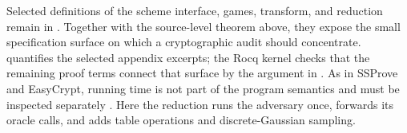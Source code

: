 Selected definitions of the scheme interface, games, transform,
and reduction remain in .  Together with
the source-level theorem above, they expose the small specification surface on
which a cryptographic audit should concentrate.
 quantifies the selected appendix excerpts;
the Rocq kernel checks that the
remaining proof terms connect that surface by the argument in
.  As in SSProve and EasyCrypt, running time is not
part of the program semantics and must be inspected separately
\cite{easycrypt,ssprove}.  Here the
reduction runs the adversary once, forwards its oracle calls, and adds table
operations and discrete-Gaussian sampling.
